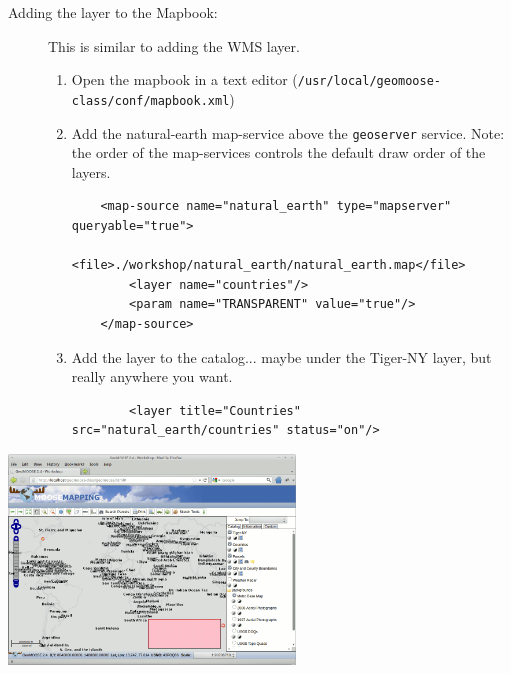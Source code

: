 \documentclass[letterpaper]{article}
\begin{document}
\begin{description}
\begin{enumerate}
  \end{enumerate}
\item[Adding the layer to the Mapbook:] This is similar to adding the
  WMS layer.
  \begin{enumerate}
    \item Open the mapbook in a text editor (\verb|/usr/local/geomoose-class/conf/mapbook.xml|)
    \item Add the natural-earth map-service above the \verb|geoserver|
      service.  Note: the order of the map-services controls the
      default draw order of the layers.
      \begin{verbatim}
	<map-source name="natural_earth" type="mapserver" queryable="true">
		<file>./workshop/natural_earth/natural_earth.map</file>
		<layer name="countries"/>
		<param name="TRANSPARENT" value="true"/>
	</map-source>
      \end{verbatim}
    \item Add the layer to the catalog... maybe under the Tiger-NY
      layer, but really anywhere you want.
      \begin{verbatim}
		<layer title="Countries" src="natural_earth/countries" status="on"/>
      \end{verbatim}
  \end{enumerate}
\end{description}

\begin{center}
  \includegraphics[width=3in]{images/06-results.png}
\end{center}
\end{document}
